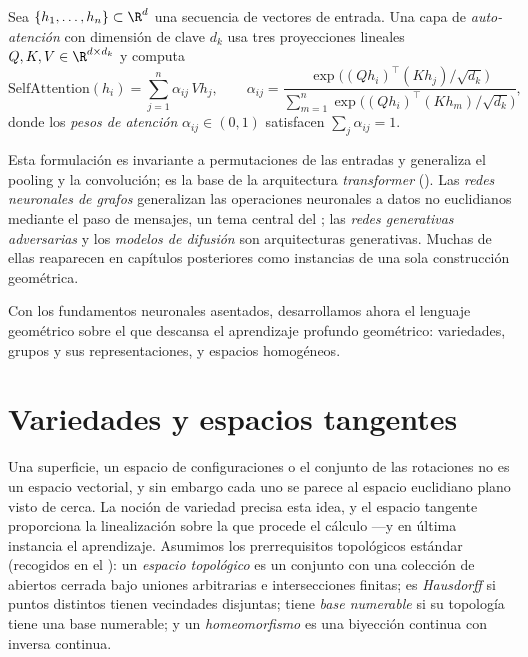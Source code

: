 \begin{definition}
\label{def:found:attention}
Sea $\{h_1, \ldots, h_n\} \subset \R^d$ una secuencia de vectores de entrada. Una
capa de \emph{auto-atenci\'on} con dimensi\'on de clave $d_k$ usa tres
proyecciones lineales $Q, K, V \in \R^{d \times d_k}$ y computa
\[
  \mathrm{SelfAttention}(h_i) = \sum_{j=1}^n \alpha_{ij}\, V h_j, \qquad
  \alpha_{ij} = \frac{\exp\bigl((Qh_i)^\top(Kh_j)/\sqrt{d_k}\bigr)}
  {\sum_{m=1}^n \exp\bigl((Qh_i)^\top(Kh_m)/\sqrt{d_k}\bigr)},
\]
donde los \emph{pesos de atenci\'on} $\alpha_{ij} \in (0,1)$ satisfacen
$\sum_j \alpha_{ij} = 1$.
\end{definition}

Esta formulaci\'on es invariante a permutaciones de las entradas y generaliza el
pooling y la convoluci\'on; es la base de la arquitectura \emph{transformer}
(). Las \emph{redes neuronales de grafos} generalizan las
operaciones neuronales a datos no euclidianos mediante el paso de mensajes, un tema
central del ; las \emph{redes generativas adversarias} y los
\emph{modelos de difusi\'on} son arquitecturas generativas. Muchas de ellas
reaparecen en cap\'itulos posteriores como instancias de una sola construcci\'on
geom\'etrica.

Con los fundamentos neuronales asentados, desarrollamos ahora el lenguaje
geom\'etrico sobre el que descansa el aprendizaje profundo geom\'etrico:
variedades, grupos y sus representaciones, y espacios homog\'eneos.

\section{Variedades y espacios tangentes}
\label{sec:found:manifolds}

Una superficie, un espacio de configuraciones o el conjunto de las rotaciones no es
un espacio vectorial, y sin embargo cada uno se parece al espacio euclidiano plano
visto de cerca. La noci\'on de variedad precisa esta idea, y el espacio tangente
proporciona la linealizaci\'on sobre la que procede el c\'alculo ---y en \'ultima
instancia el aprendizaje. Asumimos los prerrequisitos topol\'ogicos est\'andar
(recogidos en el ): un \emph{espacio topol\'ogico} es un conjunto
con una colecci\'on de abiertos cerrada bajo uniones arbitrarias e intersecciones
finitas; es \emph{Hausdorff} si puntos distintos tienen vecindades disjuntas; tiene
\emph{base numerable} si su topolog\'ia tiene una base numerable; y un
\emph{homeomorfismo} es una biyecci\'on continua con inversa continua.

